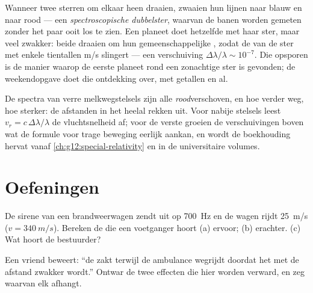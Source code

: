 \begin{example}\label{ex:g12:doppler-effect:wobble}
Wanneer twee sterren om elkaar heen draaien, zwaaien hun lijnen 
naar blauw en naar rood --- een \emph{spectroscopische
dubbelster}, waarvan de banen worden
gemeten zonder het paar ooit los te zien. Een planeet doet hetzelfde met
haar ster, maar veel zwakker: beide draaien om hun gemeenschappelijke
, zodat de  van de ster met enkele
tientallen \unit{m/s} slingert --- een verschuiving
$\Delta\lambda/\lambda \sim 10^{-7}$. Die opsporen is de manier waarop de
eerste planeet rond een zonachtige ster is gevonden; de weekendopgave doet
die ontdekking over, met getallen en al.
\end{example}

\begin{remark}\label{rem:g12:doppler-effect:expansion}
De spectra van verre melkwegstelsels zijn alle \emph{rood}verschoven, en
hoe verder weg, hoe sterker: de afstanden in het heelal rekken uit. Voor
nabije stelsels leest $v_r = c\,\Delta\lambda/\lambda$ de vluchtsnelheid
af; voor de verste groeien de verschuivingen boven wat de formule voor
trage beweging eerlijk aankan, en wordt de boekhouding hervat vanaf
\cref{ch:g12:special-relativity} en in de universitaire volumes.
\end{remark}

\section{Oefeningen}

\begin{exercise}[$\star$]\label{exo:g12:doppler-effect:1}
De sirene van een brandweerwagen zendt uit op \qty{700}{Hz} en de wagen
rijdt \qty{25}{m/s} ($v = \qty{340}{m/s}$). Bereken de  die een
voetganger hoort (a) ervoor; (b) erachter. (c) Wat hoort de bestuurder?
\end{exercise}

\begin{exercise}[$\star$]\label{exo:g12:doppler-effect:2}
Een vriend beweert: ``de  zakt terwijl de ambulance wegrijdt
doordat het  met de afstand zwakker wordt.'' Ontwar de twee effecten
die hier worden verward, en zeg waarvan elk afhangt.
\end{exercise}

